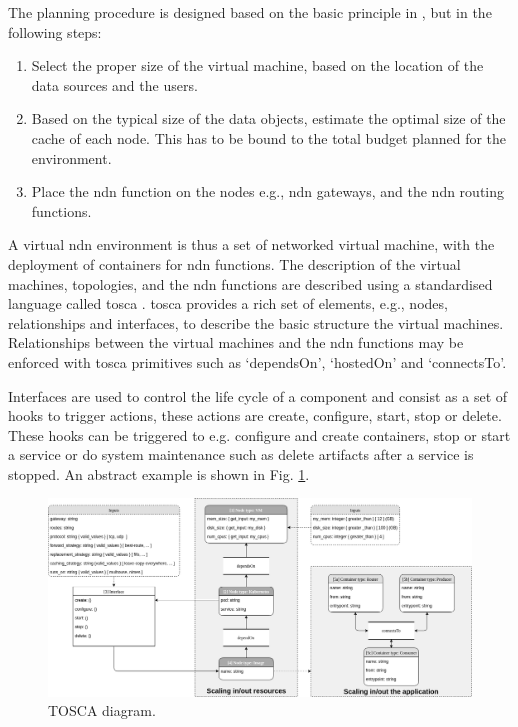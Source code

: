 \documentclass[conference]{IEEEtran}
\begin{document}
The planning procedure is designed based on the basic principle in \cite{mccabe2010network}, but in the following steps:
\begin{enumerate}
    \item Select the proper size of the virtual machine, based on the location of the data sources and the users.
    \item Based on the typical size of the data objects, estimate the optimal size of the cache of each node. This has to be bound to the total budget planned for the environment. 
    \item Place the \gls{ndn} function on the nodes e.g., \gls{ndn} gateways, and the \gls{ndn} routing functions. 
\end{enumerate}

A virtual \gls{ndn} environment is thus a set of networked virtual machine, with the deployment of containers for \gls{ndn} functions. The description of the virtual machines, topologies, and the \gls{ndn} functions are described using a standardised language called \gls{tosca} \cite{tosca-standard}.
\gls{tosca} provides a rich set of elements, e.g., nodes, relationships and interfaces, to describe the basic structure the virtual machines. Relationships between the virtual machines and the \gls{ndn} functions may be enforced with \gls{tosca} primitives such as `dependsOn', `hostedOn' and `connectsTo'. 

Interfaces are used to control the life cycle of a component and consist as a set of hooks to trigger actions, these actions are create, configure, start, stop or delete. These hooks can be triggered to e.g. configure and create containers, stop or start a service or do system maintenance such as delete artifacts after a service is stopped. An abstract example is shown in Fig. \ref{fig:tosca-diagram}.

\begin{figure}[ht]
\centering
\includegraphics[width=\textwidth]{images/tosca-diagram.png}
\caption{TOSCA diagram.}
\label{fig:tosca-diagram}
\end{figure}
\end{document}
